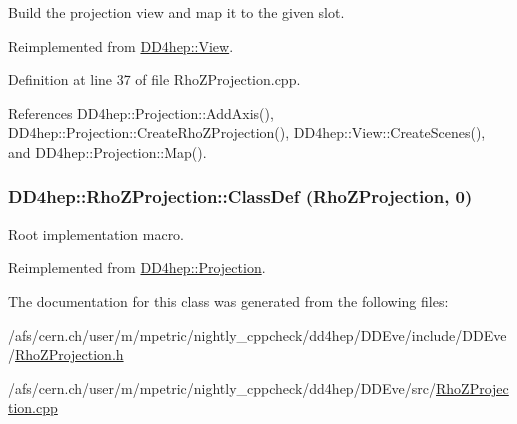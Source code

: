Build the projection view and map it to the given slot. 

Reimplemented from \hyperlink{class_d_d4hep_1_1_view_ab4e12874a9cb6a599f268b027443c6ce}{DD4hep::View}.

Definition at line 37 of file RhoZProjection.cpp.

References DD4hep::Projection::AddAxis(), DD4hep::Projection::CreateRhoZProjection(), DD4hep::View::CreateScenes(), and DD4hep::Projection::Map().\hypertarget{class_d_d4hep_1_1_rho_z_projection_aef14a29e5037f6ac2df7eb09a8fa6c84}{
\subsubsection[{ClassDef}]{\setlength{\rightskip}{0pt plus 5cm}DD4hep::RhoZProjection::ClassDef ({\bf RhoZProjection}, \/  0)}}
\label{class_d_d4hep_1_1_rho_z_projection_aef14a29e5037f6ac2df7eb09a8fa6c84}


Root implementation macro. 

Reimplemented from \hyperlink{class_d_d4hep_1_1_projection_a32d78dc00500fcb000ce25052c96fd62}{DD4hep::Projection}.

The documentation for this class was generated from the following files:\begin{DoxyCompactItemize}
\item 
/afs/cern.ch/user/m/mpetric/nightly\_\-cppcheck/dd4hep/DDEve/include/DDEve/\hyperlink{_rho_z_projection_8h}{RhoZProjection.h}\item 
/afs/cern.ch/user/m/mpetric/nightly\_\-cppcheck/dd4hep/DDEve/src/\hyperlink{_rho_z_projection_8cpp}{RhoZProjection.cpp}\end{DoxyCompactItemize}

